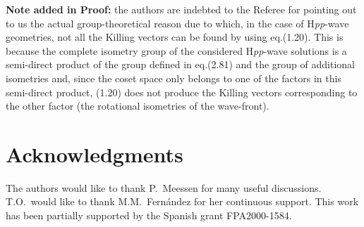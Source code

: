\documentclass[12pt,a4paper]{article}
\begin{document}
{\bf Note added in Proof:} the authors are indebted to the Referee for
pointing out to us the actual group-theoretical reason due to which,
in the case of H{\em pp}-wave geometries, not all the Killing vectors
can be found by using eq.(1.20). This is because the complete isometry
group of the considered H{\em pp}-wave solutions is a semi-direct
product of the group defined in eq.(2.81) and the group of additional
isometries and, since the coset space only belongs to one of the
factors in this semi-direct product, (1.20) does not produce the
Killing vectors corresponding to the other factor (the rotational
isometries of the wave-front). \\

\vspace{1cm}

\section*{Acknowledgments}

The authors would like to thank P.~Meessen for many useful
discussions.  T.O.~would like to thank M.M.~Fern\'andez for her
continuous support.  This work has been partially supported by the
Spanish grant FPA2000-1584.

\end{document}
